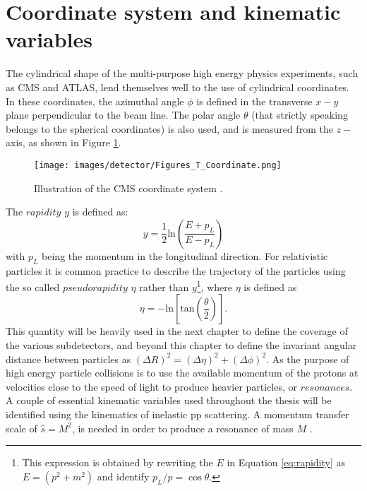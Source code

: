 \section{Coordinate system and kinematic variables}\label{sec:kin}
\noindent\justify
The cylindrical shape of the multi-purpose high energy physics experiments, such as CMS and ATLAS, lend themselves well to the use of cylindrical coordinates. 
In these coordinates, the azimuthal angle $\phi$ is defined in the transverse $x-y$ plane perpendicular to the beam line. 
The polar angle $\theta$ (that strictly speaking belongs to the spherical coordinates) is also used, and is measured from the $z-$axis, as shown in Figure \ref{fig:cylindrical}.
\begin{figure}[!htp]
  \centering
   \texttt{[image: images/detector/Figures\_T\_Coordinate.png]}
   \caption{Illustration of the CMS coordinate system \cite{Schott:2014sea}.}
   \label{fig:cylindrical}
\end{figure}                                                                               
The $rapidity$ $y$ is defined as:
\begin{equation}
y=\frac{1}{2}\mathrm{ln}\left(\frac{E+p_{L}}{E-p_{L}}\right)
\label{eq:rapidity}
\end{equation}
with $p_{L}$ being the momentum in the longitudinal direction. 
For relativistic particles it is common practice to describe the trajectory of the particles using the so called $pseudorapidity$ $\eta$ rather than $y$\footnote{This expression is obtained by rewriting the $E$ in Equation \ref{eq:rapidity} as $E=(p^{2} + m^{2})$ and identify $p_{L}/p=\cos\theta$.}, where $\eta$ is defined as
\begin{equation}
\eta=-\mathrm{ln}\left[\mathrm{tan}\left(\frac{\theta}{2}\right)\right].
\end{equation}
This quantity will be heavily used in the next chapter to define the coverage of the various subdetectors, and beyond this chapter to define the invariant angular distance between particles as $(\Delta R)^{2}=(\Delta \eta)^{2}+(\Delta \phi)^{2}$. 
As the purpose of high energy particle collisions is to use the available momentum of the protons at velocities close to the speed of light to produce heavier particles, or $resonances$. 
A couple of essential kinematic variables used throughout the thesis will be identified using the kinematics of inelastic pp scattering. 
A momentum transfer scale of $\hat{s}=M^{2}$, is needed in order to produce a resonance of mass $M$ \cite{Dissertori:2010xe}. 
